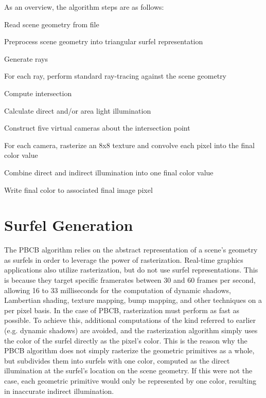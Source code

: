 As an overview, the algorithm steps are as follows:
\begin{list}{.}{ \setlength\leftmargin{.5in} \setlength\topsep{0in}}
\item Read scene geometry from file
\item Preprocess scene geometry into triangular surfel representation
\item Generate rays
\item For each ray, perform standard ray-tracing against the scene geometry
\begin{list}{.}{}
\item    Compute intersection
\item    Calculate direct and/or area light illumination
\item    Construct five virtual cameras about the intersection point
\item    For each camera, rasterize an 8x8 texture and convolve each pixel into the final color value
\item    Combine direct and indirect illumination into one final color value
\item    Write final color to associated final image pixel
\end{list}
\end{list}

\section{Surfel Generation}
\label{sec:surfel_generation}

The PBCB algorithm relies on the abstract representation of a scene's geometry as surfels in order to leverage the power of rasterization. Real-time graphics applications also utilize rasterization, but do not use surfel representations. This is because they target specific framerates between 30 and 60 frames per second, allowing 16 to 33 milliseconds for the computation of dynamic shadows, Lambertian shading, texture mapping, bump mapping, and other techniques on a per pixel basis. In the case of PBCB, rasterization must perform as fast as possible. To achieve this, additional computations of the kind referred to earlier (e.g. dynamic shadows) are avoided, and the rasterization algorithm simply uses the color of the surfel directly as the pixel's color. This is the reason why the PBCB algorithm does not simply rasterize the geometric primitives as a whole, but subdivides them into surfels with one color, computed as the direct illumination at the surfel's location on the scene geometry. If this were not the case, each geometric primitive would only be represented by one color, resulting in inaccurate indirect illumination.

